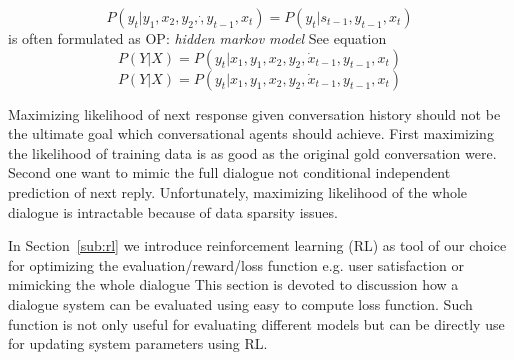 \documentclass[11pt]{article}
\def\OP#1{{\color{purple}OP: \it #1}}
\begin{document}
\begin{equation}
    P(y_t| y_1, x_2, y_2, \dot, y_{t-1}, x_t) = P(y_t | s_{t-1}, y_{t-1}, x_t)
\end{equation}
is often formulated as \OP{hidden markov model} See equation
\begin{equation}
    P(Y|X) = P(y_t | x_1, y_1, x_2, y_2, \dot x_{t-1}, y_{t-1}, x_t)
\end{equation}
\begin{equation}
    \label{eq:cond_history}
    P(Y|X) = P(y_t | x_1, y_1, x_2, y_2, \dot x_{t-1}, y_{t-1}, x_t)
\end{equation}

Maximizing likelihood of next response given conversation history should not be the ultimate goal which conversational agents should achieve.
First maximizing the likelihood of training data is as good as the original gold conversation were.
Second one want to mimic the full dialogue not conditional independent prediction of next reply.
Unfortunately, maximizing likelihood of the whole dialogue is intractable because of data sparsity issues.

In Section~\ref{sub:rl} we introduce reinforcement learning (RL) as tool of our choice for optimizing the evaluation/reward/loss function e.g. user satisfaction or mimicking the whole dialogue
This section is devoted to discussion how a dialogue system can be evaluated using easy to compute loss function.
Such function is not only useful for evaluating different models but can be directly use for updating system parameters using RL.
\end{document}
